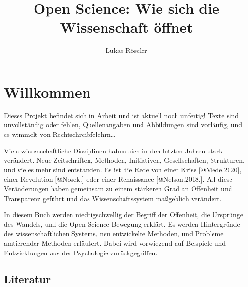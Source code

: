 \documentclass[
  letterpaper,
  DIV=11,
  numbers=noendperiod]{scrreprt}
\title{Open Science: Wie sich die Wissenschaft öffnet}
\author{Lukas Röseler}
\date{}
\renewcommand*\contentsname{Table of contents}
\newcommand\contentsname{Table of contents}
\begin{document}
\maketitle

\renewcommand*\contentsname{Table of contents}
{
\hypersetup{linkcolor=}
\setcounter{tocdepth}{2}
\tableofcontents
}


\chapter*{Willkommen}\label{willkommen}


\begin{tcolorbox}[enhanced jigsaw, bottomrule=.15mm, toprule=.15mm, opacitybacktitle=0.6, breakable, colback=white, coltitle=black, bottomtitle=1mm, toptitle=1mm, titlerule=0mm, title=\textcolor{quarto-callout-caution-color}{\faFire}\hspace{0.5em}{Warnung}, rightrule=.15mm, arc=.35mm, opacityback=0, leftrule=.75mm, left=2mm, colbacktitle=quarto-callout-caution-color!10!white, colframe=quarto-callout-caution-color-frame]

Dieses Projekt befindet sich in Arbeit und ist aktuell noch unfertig!
Texte sind unvollständig oder fehlen, Quellenangaben und Abbildungen
sind vorläufig, und es wimmelt von Rechtschreibfelehrn\ldots{}

\end{tcolorbox}

Viele wissenschaftliche Disziplinen haben sich in den letzten Jahren
stark verändert. Neue Zeitschriften, Methoden, Initiativen,
Gesellschaften, Strukturen, und vieles mehr sind entstanden. Es ist die
Rede von einer Krise {[}@Mede.2020{]}, einer Revolution {[}@Nosek.{]}
oder einer Renaissance {[}@Nelson.2018.{]}. All diese Veränderungen
haben gemeinsam zu einem stärkeren Grad an Offenheit und Transparenz
geführt und das Wissenschaftssystem maßgeblich verändert.

In diesem Buch werden niedrigschwellig der Begriff der Offenheit, die
Ursprünge des Wandels, und die Open Science Bewegung erklärt. Es werden
Hintergründe des wissenschaftlichen Systems, neu entwickelte Methoden,
und Probleme amtierender Methoden erläutert. Dabei wird vorwiegend auf
Beispiele und Entwicklungen aus der Psychologie zurückgegriffen.

\section*{Literatur}\label{literatur}
\end{document}
